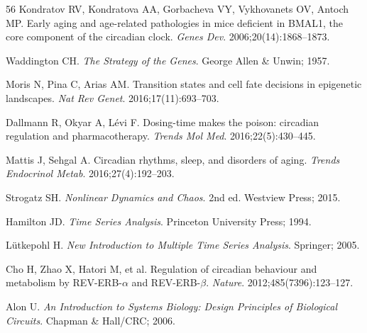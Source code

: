 \documentclass[11pt,letterpaper]{article}
\begin{document}
\begin{thebibliography}{56}
Kondratov RV, Kondratova AA, Gorbacheva VY, Vykhovanets OV, Antoch MP.
Early aging and age-related pathologies in mice deficient in BMAL1, the core component of the circadian clock.
\textit{Genes Dev}. 2006;20(14):1868--1873.

Waddington CH.
\textit{The Strategy of the Genes}. George Allen \& Unwin; 1957.

Moris N, Pina C, Arias AM.
Transition states and cell fate decisions in epigenetic landscapes.
\textit{Nat Rev Genet}. 2016;17(11):693--703.

Dallmann R, Okyar A, L{\'e}vi F.
Dosing-time makes the poison: circadian regulation and pharmacotherapy.
\textit{Trends Mol Med}. 2016;22(5):430--445.

Mattis J, Sehgal A.
Circadian rhythms, sleep, and disorders of aging.
\textit{Trends Endocrinol Metab}. 2016;27(4):192--203.

Strogatz SH.
\textit{Nonlinear Dynamics and Chaos}. 2nd ed. Westview Press; 2015.

Hamilton JD.
\textit{Time Series Analysis}. Princeton University Press; 1994.

L{\"u}tkepohl H.
\textit{New Introduction to Multiple Time Series Analysis}. Springer; 2005.

Cho H, Zhao X, Hatori M, et al.
Regulation of circadian behaviour and metabolism by REV-ERB-$\alpha$ and REV-ERB-$\beta$.
\textit{Nature}. 2012;485(7396):123--127.

Alon U.
\textit{An Introduction to Systems Biology: Design Principles of Biological Circuits}.
Chapman \& Hall/CRC; 2006.

\end{thebibliography}
\end{document}
